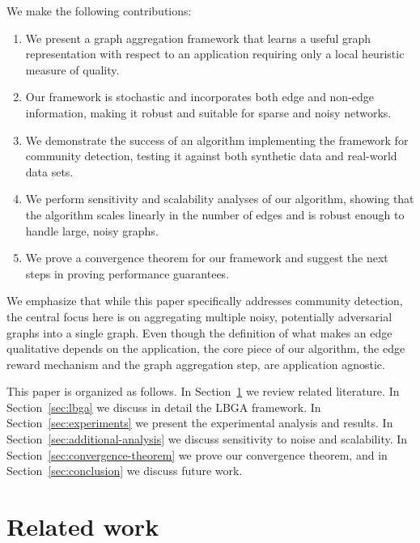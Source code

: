 \documentclass{IEEEtran}
\begin{document}
We make the following contributions:

\begin{enumerate} 
   \item We present a graph aggregation framework that learns a useful graph
representation with respect to an application requiring only a local heuristic
measure of quality.
   \item Our framework is stochastic and incorporates both edge and non-edge
information, making it robust and suitable for sparse and noisy networks.
   \item We demonstrate the success of an algorithm implementing the framework
for community detection, testing it against both synthetic data and real-world
data sets. 
   \item We perform sensitivity and scalability analyses of our algorithm,
showing that the algorithm scales linearly in the number of edges and is
robust enough to handle large, noisy graphs.  
   \item We prove a convergence theorem for our framework and suggest the next
steps in proving performance guarantees.  
\end{enumerate} 

We emphasize that while this paper specifically addresses community detection,
the central focus here is on aggregating multiple noisy, potentially
adversarial graphs into a single graph. Even though the definition of what
makes an edge qualitative depends on the application, the core piece of our
algorithm, the edge reward mechanism and the graph aggregation step, are
application agnostic. 

This paper is organized as follows. In Section~\ref{sec:related} we review
related literature. In Section~\ref{sec:lbga} we discuss in detail the LBGA
framework. In Section~\ref{sec:experiments} we present the experimental
analysis and results. In Section~\ref{sec:additional-analysis} we discuss
sensitivity to noise and scalability. In Section~\ref{sec:convergence-theorem}
we prove our convergence theorem, and in Section~\ref{sec:conclusion} we
discuss future work.

\section{Related work} 
\label{sec:related}
\end{document}
